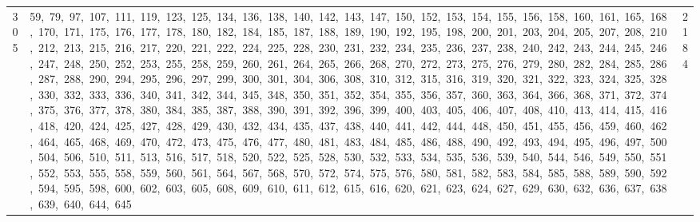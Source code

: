 \begin{longtable}{c|p{}|r}
305 & 59,\ 79,\ 97,\ 107,\ 111,\ 119,\ 123,\ 125,\ 134,\ 136,\ 138,\ 140,\ 142,\ 143,\ 147,\ 150,\ 152,\ 153,\ 154,\ 155,\ 156,\ 158,\ 160,\ 161,\ 165,\ 168,\ 170,\ 171,\ 175,\ 176,\ 177,\ 178,\ 180,\ 182,\ 184,\ 185,\ 187,\ 188,\ 189,\ 190,\ 192,\ 195,\ 198,\ 200,\ 201,\ 203,\ 204,\ 205,\ 207,\ 208,\ 210,\ 212,\ 213,\ 215,\ 216,\ 217,\ 220,\ 221,\ 222,\ 224,\ 225,\ 228,\ 230,\ 231,\ 232,\ 234,\ 235,\ 236,\ 237,\ 238,\ 240,\ 242,\ 243,\ 244,\ 245,\ 246,\ 247,\ 248,\ 250,\ 252,\ 253,\ 255,\ 258,\ 259,\ 260,\ 261,\ 264,\ 265,\ 266,\ 268,\ 270,\ 272,\ 273,\ 275,\ 276,\ 279,\ 280,\ 282,\ 284,\ 285,\ 286,\ 287,\ 288,\ 290,\ 294,\ 295,\ 296,\ 297,\ 299,\ 300,\ 301,\ 304,\ 306,\ 308,\ 310,\ 312,\ 315,\ 316,\ 319,\ 320,\ 321,\ 322,\ 323,\ 324,\ 325,\ 328,\ 330,\ 332,\ 333,\ 336,\ 340,\ 341,\ 342,\ 344,\ 345,\ 348,\ 350,\ 351,\ 352,\ 354,\ 355,\ 356,\ 357,\ 360,\ 363,\ 364,\ 366,\ 368,\ 371,\ 372,\ 374,\ 375,\ 376,\ 377,\ 378,\ 380,\ 384,\ 385,\ 387,\ 388,\ 390,\ 391,\ 392,\ 396,\ 399,\ 400,\ 403,\ 405,\ 406,\ 407,\ 408,\ 410,\ 413,\ 414,\ 415,\ 416,\ 418,\ 420,\ 424,\ 425,\ 427,\ 428,\ 429,\ 430,\ 432,\ 434,\ 435,\ 437,\ 438,\ 440,\ 441,\ 442,\ 444,\ 448,\ 450,\ 451,\ 455,\ 456,\ 459,\ 460,\ 462,\ 464,\ 465,\ 468,\ 469,\ 470,\ 472,\ 473,\ 475,\ 476,\ 477,\ 480,\ 481,\ 483,\ 484,\ 485,\ 486,\ 488,\ 490,\ 492,\ 493,\ 494,\ 495,\ 496,\ 497,\ 500,\ 504,\ 506,\ 510,\ 511,\ 513,\ 516,\ 517,\ 518,\ 520,\ 522,\ 525,\ 528,\ 530,\ 532,\ 533,\ 534,\ 535,\ 536,\ 539,\ 540,\ 544,\ 546,\ 549,\ 550,\ 551,\ 552,\ 553,\ 555,\ 558,\ 559,\ 560,\ 561,\ 564,\ 567,\ 568,\ 570,\ 572,\ 574,\ 575,\ 576,\ 580,\ 581,\ 582,\ 583,\ 584,\ 585,\ 588,\ 589,\ 590,\ 592,\ 594,\ 595,\ 598,\ 600,\ 602,\ 603,\ 605,\ 608,\ 609,\ 610,\ 611,\ 612,\ 615,\ 616,\ 620,\ 621,\ 623,\ 624,\ 627,\ 629,\ 630,\ 632,\ 636,\ 637,\ 638,\ 639,\ 640,\ 644,\ 645 & 2184 \\

\end{longtable}
